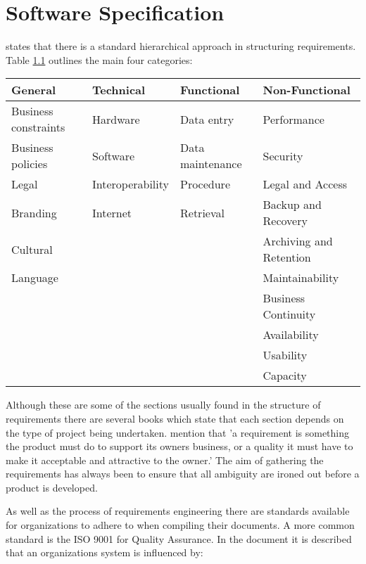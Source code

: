 \chapter{Software Specification} \label{chap:requirements} \citet{cadle10}
states that there is a standard hierarchical approach in  structuring
requirements. Table \ref{table:requirementsCategories} outlines the main four
categories:

\begin{table}[H]   \begin{tabular}{|l|l|l|l|}     \hline     {\bf General} &
{\bf Technical} & {\bf Functional} & {\bf Non-Functional} \\      \hline
Business constraints & Hardware & Data entry & Performance \\      Business
policies & Software & Data maintenance & Security \\      Legal &
Interoperability & Procedure & Legal and Access \\      Branding & Internet &
Retrieval & Backup and Recovery \\      Cultural & ~ & ~ & Archiving and
Retention \\      Language & ~ & ~ & Maintainability \\      ~ & ~ & ~ &
Business Continuity \\      ~ & ~ & ~ & Availability \\      ~ & ~ & ~ &
Usability \\      ~ & ~ & ~ & Capacity \\     \hline   \end{tabular}
\label{table:requirementsCategories} \end{table}


Although these are some of the sections usually found in the structure of
requirements there are several books which state that each section depends on
the type of project being undertaken. \citet{robertson13} mention that 'a
requirement is something the product must do to support its owners business, or
a quality it must have to make it acceptable and attractive to the owner.' The
aim of gathering the requirements has always been to ensure that all ambiguity
are ironed out before a product is developed. 

As well as the process of requirements engineering there are standards available
for organizations to adhere to when compiling their documents. A more common
standard is the ISO 9001 for Quality Assurance. In the document it is described
that an organizations system is influenced by:


